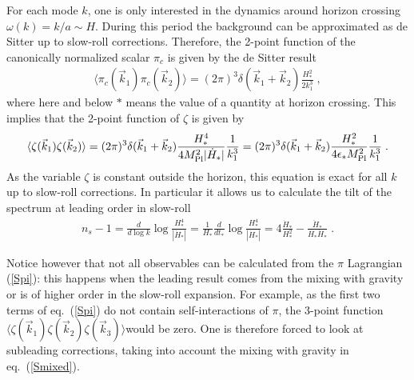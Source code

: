 \documentclass[12pt,letterpaper]{article}
\def\be{\begin{eqnarray}}
\def\ee{\end{eqnarray}}
\begin{document}
{For each mode $k$, one is only interested in the dynamics around horizon crossing $\omega(k) = k/a \sim H$. During this period the background can be approximated as de Sitter up to slow-roll corrections. Therefore, the 2-point function of the canonically normalized scalar $\pi_c$ is given by the de Sitter result 
\be
\langle \pi_c(\vec k_1) \pi_c(\vec k_2)\rangle = (2 \pi)^3 \delta(\vec k_1 + \vec k_2) \frac{H^2_*}{2 k_1^3} \;,
\ee
 where here and below $*$ means the value of a quantity at horizon crossing. This implies that the 2-point function of $\zeta$ is given by
\be
\label{eq:spectrumzeta}
\langle \zeta(\vec k_1) \zeta(\vec k_2)\rangle = (2 \pi)^3 \delta(\vec k_1 + \vec k_2) \frac{H^4_*}{4 M_{\rm Pl}^2 |\dot H_*|}\frac{1}{k_1^3} = (2 \pi)^3 \delta(\vec k_1 + \vec k_2) \frac{H_*^2}{4 \epsilon_* M_{\rm Pl}^2} \frac{1}{k_1^3} \;.
\ee 
As the variable $\zeta$ is constant outside the horizon, this equation is exact for all $k$ up to slow-roll corrections. In particular  it allows us to calculate the tilt of the spectrum at leading order in slow-roll
\be
n_s-1= \frac{d}{d \log k} \log \frac{H_*^4}{|\dot H_*|} = \frac1{H_*} \frac{d}{d t_*} \log \frac{H_*^4}{|\dot H_*|} = 4 \frac{\dot H_*}{H_*^2} - \frac{\ddot H_*}{H_* \dot H_*} \;.
\ee 

Notice however that not all observables can be calculated from the $\pi$ Lagrangian (\ref{Spi}): this happens when the leading result comes from the mixing with gravity or is of higher order in the slow-roll expansion.  For example, as the first two terms of eq.~(\ref{Spi}) do not contain self-interactions of $\pi$, the 3-point function $\langle \zeta(\vec k_1) \zeta(\vec k_2) \zeta(\vec k_3) \rangle $would be zero. One is therefore forced to  look at subleading corrections, taking into account the mixing with gravity in eq.~(\ref{Smixed}). 

}
\end{document}
